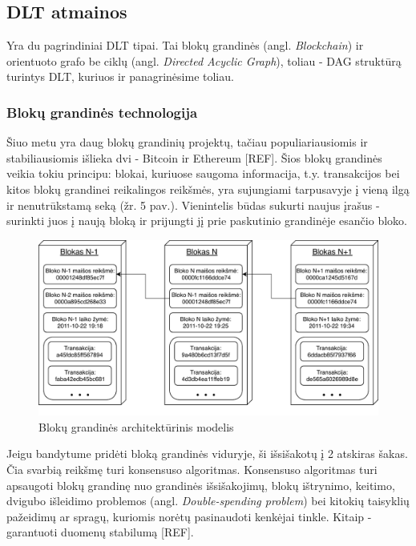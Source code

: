 \subsection{DLT atmainos}

Yra du pagrindiniai DLT tipai. Tai blokų grandinės (angl. \textit{Blockchain}) ir orientuoto grafo be ciklų (angl. \textit{Directed Acyclic Graph}), toliau - DAG struktūrą turintys DLT, kuriuos ir panagrinėsime toliau.

\subsubsection{Blokų grandinės technologija}

Šiuo metu yra daug blokų grandinių projektų, tačiau populiariausiomis ir stabiliausiomis išlieka dvi - Bitcoin ir Ethereum [REF]. Šios blokų grandinės veikia tokiu principu: blokai, kuriuose saugoma informacija, t.y. transakcijos bei kitos blokų grandinei reikalingos reikšmės, yra sujungiami tarpusavyje į vieną ilgą ir nenutrūkstamą seką (žr. 5 pav.). Vienintelis būdas sukurti naujus įrašus - surinkti juos į naują bloką ir prijungti jį prie paskutinio grandinėje esančio bloko.

\begin{figure}[H]
    \centering
    \includegraphics[scale=0.85]{images/block-chain-architecture}
    \caption{Blokų grandinės architektūrinis modelis}
\end{figure}


Jeigu bandytume pridėti bloką grandinės viduryje, ši išsišakotų į 2 atskiras šakas. Čia svarbią reikšmę turi konsensuso algoritmas. Konsensuso algoritmas turi apsaugoti blokų grandinę nuo grandinės išsišakojimų, blokų ištrynimo, keitimo, dvigubo išleidimo problemos (angl. \textit{Double-spending problem}) bei kitokių taisyklių pažeidimų ar spragų, kuriomis norėtų pasinaudoti kenkėjai tinkle. Kitaip - garantuoti duomenų stabilumą [REF].

